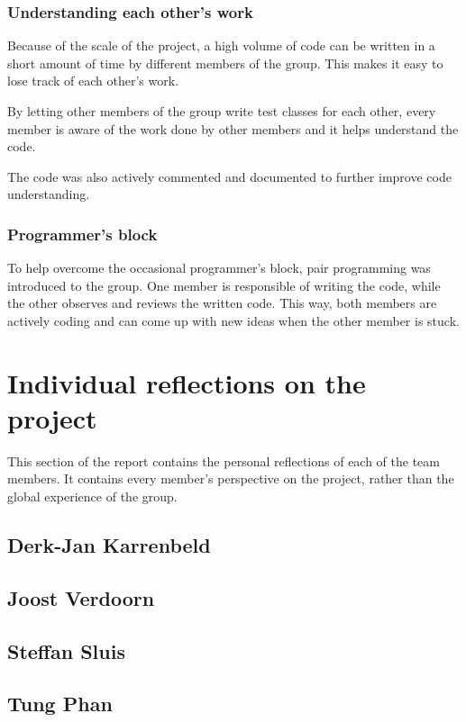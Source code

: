 \documentclass[10pt,a4paper]{report}
\begin{document}
			\subsubsection*{Understanding each other's work}
				Because of the scale of the project, a high volume of code can be written in a short amount of time by different members of the group. This makes it easy to lose track of each other's work. 
				
				By letting other members of the group write test classes for each other, every member is aware of the work done by other members and it helps understand the code. 
				
				The code was also actively commented and documented to further improve code understanding.
			\subsubsection*{Programmer's block}
				To help overcome the occasional programmer's block, pair programming was introduced to the group. One member is responsible of writing the code, while the other observes and reviews the written code. This way, both members are actively coding and can come up with new ideas when the other member is stuck.
\clearpage
	\section{Individual reflections on the project}
		This section of the report contains the personal reflections of each of the team members. It contains every member's perspective on the project, rather than the global experience of the group.
		\subsection{Derk-Jan Karrenbeld}
			
			\clearpage
		\subsection{Joost Verdoorn}
			
			\clearpage
		\subsection{Steffan Sluis}
			
			\clearpage
		\subsection{Tung Phan}
			
			\clearpage
\end{document}
